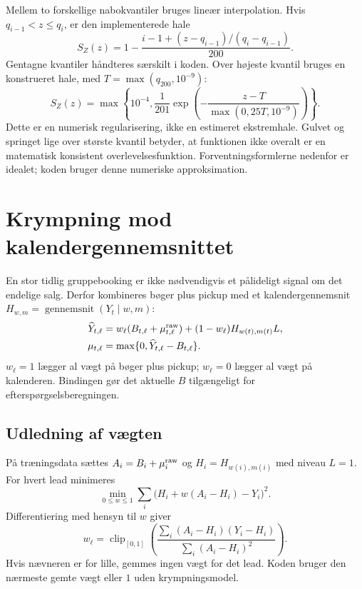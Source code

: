 \documentclass[11pt,a4paper]{article}
\newcommand{\clip}{\operatorname{clip}}\newcommand{\pos}[1]{\left[#1\right]_+}
\newcommand{\code}[1]{\texttt{\small\detokenize{#1}}}
\begin{document}
Mellem to forskellige nabokvantiler bruges lineær interpolation. Hvis
$q_{i-1}<z\leq q_i$, er den implementerede hale
\begin{equation}
S_Z(z)=1-\frac{i-1+(z-q_{i-1})/(q_i-q_{i-1})}{200}.
\end{equation}
Gentagne kvantiler håndteres særskilt i koden. Over højeste kvantil bruges en
konstrueret hale, med $T=\max(q_{200},10^{-9})$:
\begin{equation}
S_Z(z)=\max\left\{10^{-4},\frac{1}{201}\exp\left(-\frac{z-T}{\max(0{,}25T,10^{-9})}\right)\right\}.
\end{equation}
Dette er en numerisk regularisering, ikke en estimeret ekstremhale. Gulvet og
springet lige over største kvantil betyder, at funktionen ikke overalt er en
matematisk konsistent overlevelsesfunktion. Forventningsformlerne nedenfor er
idealet; koden bruger denne numeriske approksimation.

\newpage
\section{Krympning mod kalendergennemsnittet}
En stor tidlig gruppebooking er ikke nødvendigvis et pålideligt signal om det
endelige salg. Derfor kombineres bøger plus pickup med et kalendergennemsnit
$H_{w,m}=\operatorname{gennemsnit}(Y_t\mid w,m)$:
\begin{align}
\widehat Y_{t,\ell}&=w_\ell(B_{t,\ell}+\mu^{\rm raw}_{t,\ell})
 +(1-w_\ell)H_{w(t),m(t)}L,\label{eq:shrink}\\
\mu_{t,\ell}&=\max\{0,\widehat Y_{t,\ell}-B_{t,\ell}\}.\label{eq:mu}
\end{align}
$w_\ell=1$ lægger al vægt på bøger plus pickup; $w_\ell=0$ lægger al vægt på
kalenderen. Bindingen \code{model.bind(otb)} gør det aktuelle $B$ tilgængeligt
for efterspørgselsberegningen.

\subsection{Udledning af vægten}
På træningsdata sættes $A_i=B_i+\mu_i^{\rm raw}$ og $H_i=H_{w(i),m(i)}$ med
niveau $L=1$. For hvert lead minimeres
\begin{equation}\min_{0\leq w\leq1}\sum_i\bigl(H_i+w(A_i-H_i)-Y_i\bigr)^2.\end{equation}
Differentiering med hensyn til $w$ giver
\begin{equation}\boxed{w_\ell=\clip_{[0,1]}
\left(\frac{\sum_i(A_i-H_i)(Y_i-H_i)}{\sum_i(A_i-H_i)^2}\right).}\end{equation}
Hvis nævneren er for lille, gemmes ingen vægt for det lead. Koden bruger den
nærmeste gemte vægt eller $1$ uden krympningsmodel.
\end{document}
